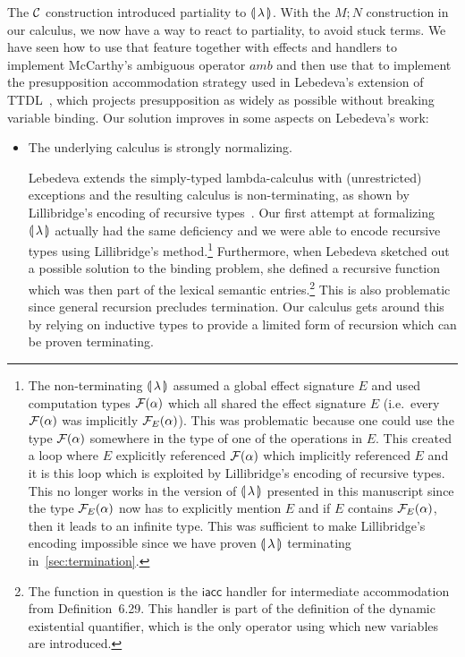 The $\mathcal{C}$ construction introduced partiality to ${\llparenthesis \, \lambda \, \rrparenthesis}$. With the $M; N$
construction in our calculus, we now have a way to react to partiality, to
avoid stuck terms. We have seen how to use that feature together with
effects and handlers to implement McCarthy's ambiguous operator $amb$ and
then use that to implement the presupposition accommodation strategy used
in Lebedeva's extension of TTDL~\cite{lebedeva2012expression}, which
projects presupposition as widely as possible without breaking variable
binding. Our solution improves in some aspects on Lebedeva's work:

\begin{itemize}
\item The underlying calculus is strongly normalizing.

  Lebedeva extends the simply-typed lambda-calculus with (unrestricted)
  exceptions and the resulting calculus is non-terminating, as shown by
  Lillibridge's encoding of recursive
  types~\cite{lillibridge1995exceptions}. Our first attempt at formalizing
  ${\llparenthesis \, \lambda \, \rrparenthesis}$ actually had the same deficiency and we were able to encode
  recursive types using Lillibridge's method.\footnote{The non-terminating
    ${\llparenthesis \, \lambda \, \rrparenthesis}$ assumed a global effect signature $E$ and used computation
    types $\mathcal{F}(\alpha)$ which all shared the effect signature $E$ (i.e.\
    every $\mathcal{F}(\alpha)$ was implicitly $\mathcal{F}_E(\alpha)$). This was
    problematic because one could use the type $\mathcal{F}(\alpha)$ somewhere in
    the type of one of the operations in $E$. This created a loop where $E$
    explicitly referenced $\mathcal{F}(\alpha)$ which implicitly referenced $E$ and
    it is this loop which is exploited by Lillibridge's encoding of
    recursive types. This no longer works in the version of ${\llparenthesis \, \lambda \, \rrparenthesis}$
    presented in this manuscript since the type $\mathcal{F}_E(\alpha)$ now has to
    explicitly mention $E$ and if $E$ contains $\mathcal{F}_E(\alpha)$, then it
    leads to an infinite type. This was sufficient to make Lillibridge's
    encoding impossible since we have proven ${\llparenthesis \, \lambda \, \rrparenthesis}$ terminating
    in~\ref{sec:termination}.} Furthermore, when Lebedeva sketched out a
  possible solution to the binding problem, she defined a recursive
  function which was then part of the lexical semantic
  entries.\footnote{The function in question is the $\textsf{iacc}$ handler
    for intermediate accommodation from Definition~6.29. This handler is
    part of the definition of the dynamic existential quantifier, which is
    the only operator using which new variables are introduced.} This is
  also problematic since general recursion precludes termination. Our
  calculus gets around this by relying on inductive types to provide a
  limited form of recursion which can be proven terminating.


\end{itemize}
